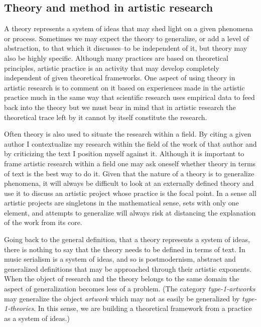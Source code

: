 \documentclass[a4paper]{article}
\begin{document}
\subsection*{\textsf{Theory and method in artistic research}}

A theory represents a system of ideas that may shed light on a given phenomena or process. Sometimes we may expect the theory to generalize, or add a level of abstraction, to that which it discusses--to be independent of it, but theory may also be highly specific. Although many practices are based on theoretical principles, artistic practice is an activity that may develop completely independent of given theoretical frameworks. One aspect of using theory in artistic research is to comment on it based on experiences made in the artistic practice much in the same way that scientific research uses empirical data to feed back into the theory but we must bear in mind that in artistic research the theoretical trace left by it cannot by itself constitute the research.

Often theory is also used to situate the research within a field. By citing a given author I contextualize my research within the field of the work of that author and by criticizing the text I position myself against it. Although it is important to frame artistic research within a field one may ask oneself whether theory in terms of text is the best way to do it. Given that the nature of a theory is to generalize phenomena, it will always be difficult to look at an externally defined theory and use it to discuss an artistic project whose practice is the focal point. In a sense all artistic projects are singletons in the mathematical sense, sets with only one element, and attempts to generalize will always risk at distancing the explanation of the work from its core.

Going back to the general definition, that a theory represents a system of ideas, there is nothing to say that the theory needs to be defined in terms of text. In music serialism is a system of ideas, and so is postmodernism, abstract and generalized definitions that may be approached through their artistic exponents. When the object of research and the theory belongs to the same domain the aspect of generalization becomes less of a problem. (The category \emph{type-1-artworks} may generalize the object \emph{artwork} which may not as easily be generalized by \emph{type-1-theories}. In this sense, we are building a theoretical framework from a practice as a system of ideas.)
\end{document}
